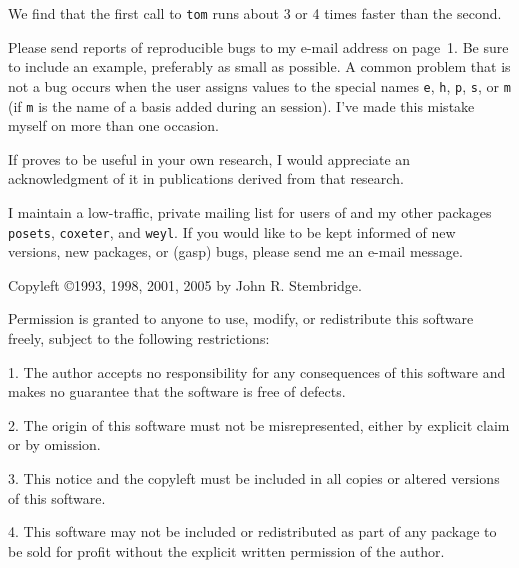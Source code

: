 \smallskip
{}
\smallskip

\noindent We find that the first call to {\tt tom} runs about 3 or 4 times
faster than the second.

Please send reports of reproducible bugs to my e-mail address on page~1.
Be sure to include an example, preferably as small as possible.
A common problem that is not a bug occurs when the user assigns
values to the special names {\tt e}, {\tt h}, {\tt p}, {\tt s}, or {\tt m}
(if {\tt m} is the name of a basis added during an \SF{} session).
I've made this mistake myself on more than one occasion.

If \SF{} proves to be useful in your own research, I would appreciate an
acknowledgment of it in publications derived from that research.

 I maintain a low-traffic, private mailing list for
users of \SF{} and my other packages {\tt posets}, {\tt coxeter}, and
{\tt weyl}. If you would like to be kept informed of new versions, new
packages, or (gasp) bugs, please send me an e-mail message.

\newpage
{}
Copyleft \copyright 1993, 1998, 2001, 2005 by John R. Stembridge.

Permission is granted to anyone to use, modify, or redistribute this
software freely, subject to the following restrictions:\medskip

\item{1.} The author accepts no responsibility for any consequences of this
software and makes no guarantee that the software is free of defects.
\smallskip
\item{2.} The origin of this software must not be misrepresented, either by
explicit claim or by omission.
\smallskip
\item{3.} This notice and the copyleft must be included in all copies or
altered versions of this software.
\smallskip
\item{4.} This software may not be included or redistributed as part of any
package to be sold for profit without the explicit written permission of the
author.

